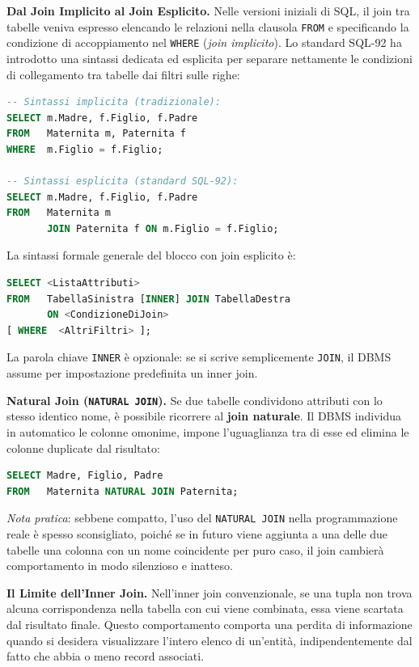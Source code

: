 \documentclass[12pt]{extarticle}
\begin{document}
\medskip
\noindent \textbf{Dal Join Implicito al Join Esplicito.} Nelle versioni iniziali di SQL, il join tra tabelle veniva espresso elencando le relazioni nella clausola \texttt{FROM} e specificando la condizione di accoppiamento nel \texttt{WHERE} (\textit{join implicito}). Lo standard SQL-92 ha introdotto una sintassi dedicata ed esplicita per separare nettamente le condizioni di collegamento tra tabelle dai filtri sulle righe:

\begin{lstlisting}[language=SQL]
-- Sintassi implicita (tradizionale):
SELECT m.Madre, f.Figlio, f.Padre
FROM   Maternita m, Paternita f
WHERE  m.Figlio = f.Figlio;

-- Sintassi esplicita (standard SQL-92):
SELECT m.Madre, f.Figlio, f.Padre
FROM   Maternita m
       JOIN Paternita f ON m.Figlio = f.Figlio;
\end{lstlisting}
La sintassi formale generale del blocco con join esplicito è:
\begin{lstlisting}[language=SQL]
SELECT <ListaAttributi>
FROM   TabellaSinistra [INNER] JOIN TabellaDestra
       ON <CondizioneDiJoin>
[ WHERE  <AltriFiltri> ];
\end{lstlisting}
La parola chiave \texttt{INNER} è opzionale: se si scrive semplicemente \texttt{JOIN}, il DBMS assume per impostazione predefinita un inner join.

\medskip
\noindent \textbf{Natural Join (\texttt{NATURAL JOIN}).} Se due tabelle condividono attributi con lo stesso identico nome, è possibile ricorrere al \textbf{join naturale}. Il DBMS individua in automatico le colonne omonime, impone l'uguaglianza tra di esse ed elimina le colonne duplicate dal risultato:
\begin{lstlisting}[language=SQL]
SELECT Madre, Figlio, Padre
FROM   Maternita NATURAL JOIN Paternita;
\end{lstlisting}
\textit{Nota pratica}: sebbene compatto, l'uso del \texttt{NATURAL JOIN} nella programmazione reale è spesso sconsigliato, poiché se in futuro viene aggiunta a una delle due tabelle una colonna con un nome coincidente per puro caso, il join cambierà comportamento in modo silenzioso e inatteso.

\noindent \textbf{Il Limite dell'Inner Join.} Nell'inner join convenzionale, se una tupla non trova alcuna corrispondenza nella tabella con cui viene combinata, essa viene scartata dal risultato finale. Questo comportamento comporta una perdita di informazione quando si desidera visualizzare l'intero elenco di un'entità, indipendentemente dal fatto che abbia o meno record associati.
\end{document}
